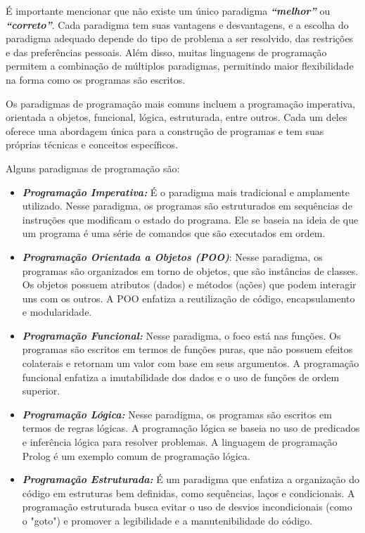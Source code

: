 \documentclass[a4paper, 12pt, onecolumn,singlespacing]{article}
\begin{document}
	É importante mencionar que não existe um único paradigma \textbf{\textit{``melhor''}} ou \textbf{\textit{``correto''}}. Cada paradigma tem suas vantagens e desvantagens, e a escolha do paradigma adequado depende do tipo de problema a ser resolvido, das restrições e das preferências pessoais. Além disso, muitas linguagens de programação permitem a combinação de múltiplos paradigmas, permitindo maior flexibilidade na forma como os programas são escritos.
	
	Os paradigmas de programação mais comuns incluem a programação imperativa, orientada a objetos, funcional, lógica, estruturada, entre outros. Cada um deles oferece uma abordagem única para a construção de programas e tem suas próprias técnicas e conceitos específicos.
	
	Alguns paradigmas de programação são:
	
	\begin{itemize}
		\item \textbf{\textit{Programação Imperativa: }}É o paradigma mais tradicional e amplamente utilizado. Nesse paradigma, os programas são estruturados em sequências de instruções que modificam o estado do programa. Ele se baseia na ideia de que um programa é uma série de comandos que são executados em ordem.
		
		\item \textbf{\textit{Programação Orientada a Objetos (POO)}}: Nesse paradigma, os programas são organizados em torno de objetos, que são instâncias de classes. Os objetos possuem atributos (dados) e métodos (ações) que podem interagir uns com os outros. A POO enfatiza a reutilização de código, encapsulamento e modularidade.
		
		\item \textbf{\textit{Programação Funcional:}} Nesse paradigma, o foco está nas funções. Os programas são escritos em termos de funções puras, que não possuem efeitos colaterais e retornam um valor com base em seus argumentos. A programação funcional enfatiza a imutabilidade dos dados e o uso de funções de ordem superior.
		
		\item \textbf{\textit{Programação Lógica:}} Nesse paradigma, os programas são escritos em termos de regras lógicas. A programação lógica se baseia no uso de predicados e inferência lógica para resolver problemas. A linguagem de programação Prolog é um exemplo comum de programação lógica.
		
		\item \textbf{\textit{Programação Estruturada:}} É um paradigma que enfatiza a organização do código em estruturas bem definidas, como sequências, laços e condicionais. A programação estruturada busca evitar o uso de desvios incondicionais (como o "goto") e promover a legibilidade e a manutenibilidade do código.
		
	\end{itemize}
	
\end{document}
